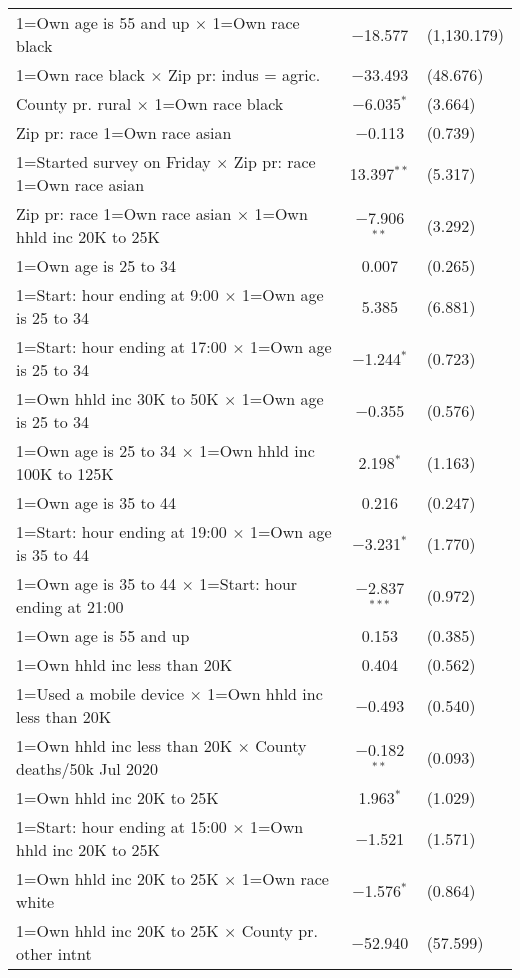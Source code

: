 \begin{table}[!htbp]
\begin{tabular}{@{\extracolsep{5pt}}lc}
  1=Own age is 55 and up  $\times$ 1=Own race black & $-$18.577 & (1,130.179) \\ 
  1=Own race black $\times$ Zip pr: indus = agric. & $-$33.493 & (48.676) \\ 
  County pr. rural $\times$ 1=Own race black & $-$6.035$^{*}$ & (3.664) \\ 
  Zip pr: race 1=Own race asian & $-$0.113 & (0.739) \\ 
  1=Started survey on Friday $\times$ Zip pr: race 1=Own race asian & 13.397$^{**}$ & (5.317) \\ 
  Zip pr: race 1=Own race asian $\times$ 1=Own hhld inc 20K to 25K & $-$7.906$^{**}$ & (3.292) \\ 
  1=Own age is 25 to 34 & 0.007 & (0.265) \\ 
  1=Start: hour ending at 9:00 $\times$ 1=Own age is 25 to 34 & 5.385 & (6.881) \\ 
  1=Start: hour ending at 17:00 $\times$ 1=Own age is 25 to 34 & $-$1.244$^{*}$ & (0.723) \\ 
  1=Own hhld inc 30K to 50K $\times$ 1=Own age is 25 to 34 & $-$0.355 & (0.576) \\ 
  1=Own age is 25 to 34 $\times$ 1=Own hhld inc 100K to 125K & 2.198$^{*}$ & (1.163) \\ 
  1=Own age is 35 to 44 & 0.216 & (0.247) \\ 
  1=Start: hour ending at 19:00 $\times$ 1=Own age is 35 to 44 & $-$3.231$^{*}$ & (1.770) \\ 
  1=Own age is 35 to 44 $\times$ 1=Start: hour ending at 21:00 & $-$2.837$^{***}$ & (0.972) \\ 
  1=Own age is 55 and up  & 0.153 & (0.385) \\ 
  1=Own hhld inc less than 20K & 0.404 & (0.562) \\ 
  1=Used a mobile device $\times$ 1=Own hhld inc less than 20K & $-$0.493 & (0.540) \\ 
  1=Own hhld inc less than 20K $\times$ County deaths/50k Jul 2020 & $-$0.182$^{**}$ & (0.093) \\ 
  1=Own hhld inc 20K to 25K & 1.963$^{*}$ & (1.029) \\ 
  1=Start: hour ending at 15:00 $\times$ 1=Own hhld inc 20K to 25K & $-$1.521 & (1.571) \\ 
  1=Own hhld inc 20K to 25K $\times$ 1=Own race white & $-$1.576$^{*}$ & (0.864) \\ 
  1=Own hhld inc 20K to 25K $\times$ County pr. other intnt & $-$52.940 & (57.599) \\ 

\end{tabular}
\end{table}
